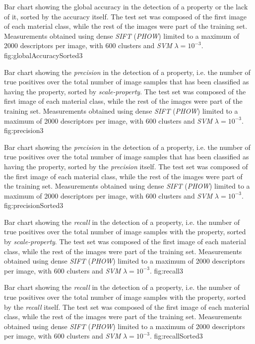 {Bar chart showing the global accuracy in the detection of a property or the lack of it, sorted by the accuracy itself. The test set was composed of the first image of each material class, while the rest of the images were part of the training set. Measurements obtained using dense \emph{SIFT} (\emph{PHOW}) limited to a maximum of 2000 descriptors per image, with 600 clusters and \emph{SVM} $\lambda=10^{-3}$.}
{fig:globalAccuracySorted3}

{Bar chart showing the \emph{precision} in the detection of a property, i.e. the number of true positives over the total number of image samples that has been classified as having the property, sorted by \emph{scale-property}. The test set was composed of the first image of each material class, while the rest of the images were part of the training set. Measurements obtained using dense \emph{SIFT} (\emph{PHOW}) limited to a maximum of 2000 descriptors per image, with 600 clusters and \emph{SVM} $\lambda=10^{-3}$.}
{fig:precision3}

{Bar chart showing the \emph{precision} in the detection of a property, i.e. the number of true positives over the total number of image samples that has been classified as having the property, sorted by the \emph{precision} itself. The test set was composed of the first image of each material class, while the rest of the images were part of the training set. Measurements obtained using dense \emph{SIFT} (\emph{PHOW}) limited to a maximum of 2000 descriptors per image, with 600 clusters and \emph{SVM} $\lambda=10^{-3}$.}
{fig:precisionSorted3}

{Bar chart showing the \emph{recall} in the detection of a property, i.e. the number of true positives over the total number of image samples with the property, sorted by \emph{scale-property}. The test set was composed of the first image of each material class, while the rest of the images were part of the training set. Measurements obtained using dense \emph{SIFT} (\emph{PHOW}) limited to a maximum of 2000 descriptors per image, with 600 clusters and \emph{SVM} $\lambda=10^{-3}$.}
{fig:recall3}

{Bar chart showing the \emph{recall} in the detection of a property, i.e. the number of true positives over the total number of image samples with the property, sorted by the \emph{recall} itself. The test set was composed of the first image of each material class, while the rest of the images were part of the training set. Measurements obtained using dense \emph{SIFT} (\emph{PHOW}) limited to a maximum of 2000 descriptors per image, with 600 clusters and \emph{SVM} $\lambda=10^{-3}$.}
{fig:recallSorted3}


